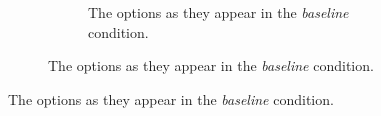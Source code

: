 \begin{figure}[th]
\begin{subfigure}{0.5\columnwidth}
		\begin{subfigure}{\columnwidth}
				\centering
	    \caption {The options as they appear in the \emph{baseline} condition. \label{fig:baseline-choices}}
	    \end{subfigure}


\end{subfigure}
\end{figure}
